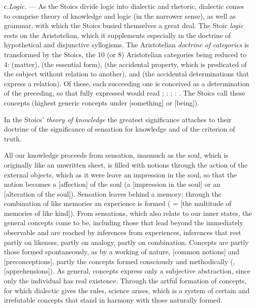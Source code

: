 \divrule

c.\enspace \emph{Logic.} --- As the Stoics divide logic into dialectic and
rhetoric, dialectic comes to comprise theory of knowledge and logic (in the
narrower sense), as well as grammar, with which the Stoics busied themselves a
great deal. The Stoic \emph{logic} rests on the Aristotelian, which it
supplements especially in the doctrine of hypothetical and disjunctive
syllogisms. The Aristotelian \emph{doctrine of categories} is transformed by
the Stoics, the 10 (or 8) Aristotelian categories being reduced to 4:
 (matter),  (the essential form),
 (the accidental property, which is predicated of the subject
without relation to another), and  (the accidental
determinations that express a relation). Of these, each succeeding
one is conceived as a determination of the preceding, so that 
fully expressed would read ; :
; : .
The Stoics call these concepts  (highest generic concepts
under  [something] or  [being]).

In the Stoics' \emph{theory of knowledge} the greatest significance attaches
to their doctrine of the significance of sensation for knowledge and of the
criterion of truth.

All our knowledge proceeds from sensation, inasmuch as the soul, which is
originally like an unwritten sheet, is filled with notions through the action
of the external objects, which as it were leave an impression in the soul, so
that the notion becomes a  [affection] of the soul (a
 [impression in the soul] or an  [alteration of the soul]). Sensation leaves behind a memory; through
the combination of like memories an experience is formed (
=  [the multitude of memories of like
kind]). From sensations, which also relate to our inner states, the general
concepts come to be, including those that lead beyond the immediately
observable and are reached by inferences from experiences, inferences that
rest partly on likeness, partly on analogy, partly on combination. Concepts
are partly those formed spontaneously, as by a working of nature,
 [common notions] and  [preconceptions],
partly the concepts formed consciously and methodically (,
 [apprehensions]). As general, concepts express only a
subjective abstraction, since only the individual has real existence. Through
the artful formation of concepts, for which dialectic gives the rules, science
arises, which is a system of certain and irrefutable concepts that stand in
harmony with those naturally formed.

